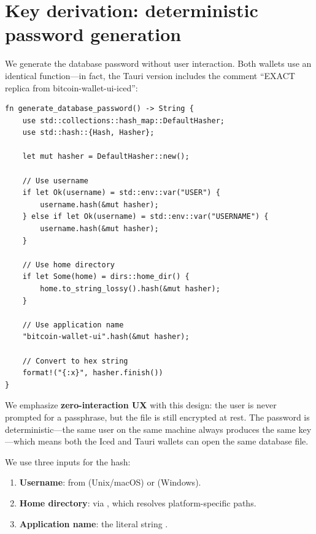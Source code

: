 \section{Key derivation: deterministic password generation}
\label{sec:key-derivation}

We generate the database password without user interaction. Both wallets use an identical  function---in fact, the Tauri version includes the comment ``EXACT replica from bitcoin-wallet-ui-iced'':

\begin{listing}[htbp]
\caption{Deterministic password generation (identical in both wallets)}
\label{lst:ch20-password-gen}
\begin{verbatim}
fn generate_database_password() -> String {
    use std::collections::hash_map::DefaultHasher;
    use std::hash::{Hash, Hasher};

    let mut hasher = DefaultHasher::new();

    // Use username
    if let Ok(username) = std::env::var("USER") {
        username.hash(&mut hasher);
    } else if let Ok(username) = std::env::var("USERNAME") {
        username.hash(&mut hasher);
    }

    // Use home directory
    if let Some(home) = dirs::home_dir() {
        home.to_string_lossy().hash(&mut hasher);
    }

    // Use application name
    "bitcoin-wallet-ui".hash(&mut hasher);

    // Convert to hex string
    format!("{:x}", hasher.finish())
}
\end{verbatim}
\end{listing}

We emphasize \textbf{zero-interaction UX} with this design: the user is never prompted for a passphrase, but the file is still encrypted at rest. The password is deterministic---the same user on the same machine always produces the same key---which means both the Iced and Tauri wallets can open the same database file.

We use three inputs for the hash:

\begin{enumerate}
  \item \textbf{Username}: from  (Unix/macOS) or  (Windows).
  \item \textbf{Home directory}: via , which resolves platform-specific paths.
  \item \textbf{Application name}: the literal string .
\end{enumerate}

